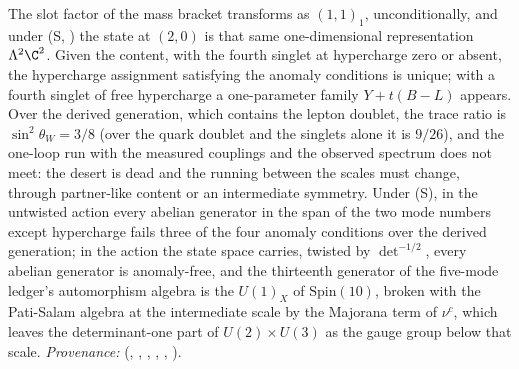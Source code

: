 The slot factor of the mass bracket transforms as $(1,1)_{1}$, unconditionally, and under (S, ) the state at $(2,0)$ is that same one-dimensional representation $\Lambda^{2}\C^{2}$. Given the content, with the fourth singlet at hypercharge zero or absent, the hypercharge assignment satisfying the anomaly conditions is unique; with a fourth singlet of free hypercharge a one-parameter family $Y + t(B - L)$ appears. Over the derived generation, which contains the lepton doublet, the trace ratio is $\sin^{2}\theta_{W} = 3/8$ (over the quark doublet and the singlets alone it is $9/26$), and the one-loop run with the measured couplings and the observed spectrum does not meet: the desert is dead and the running between the scales must change, through partner-like content or an intermediate symmetry. Under (S), in the untwisted action every abelian generator in the span of the two mode numbers except hypercharge fails three of the four anomaly conditions over the derived generation; in the action the state space carries, twisted by $\det^{-1/2}$, every abelian generator is anomaly-free, and the thirteenth generator of the five-mode ledger's automorphism algebra is the $U(1)_{X}$ of $\mathrm{Spin}(10)$, broken with the Pati-Salam algebra at the intermediate scale by the Majorana term of $\nu^{c}$, which leaves the determinant-one part of $U(2) \times U(3)$ as the gauge group below that scale. \emph{Provenance:} \cite[Prop.~3.2, Prop.~5.8(1), (3), Thm.~5.5(3), Props.~6.1, 6.2, 10.7]{ButlerT12} (, , , , , ).
